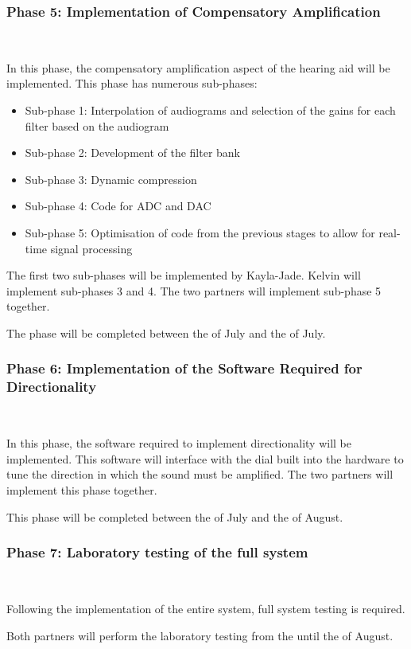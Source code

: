 \documentclass[10pt,twocolumn]{witseiepaper}
\begin{document}
\subsubsection*{Phase 5: Implementation of Compensatory Amplification} $    $

In this phase, the compensatory amplification aspect of the hearing aid will be implemented. This phase has numerous sub-phases:
\begin{itemize}
	\item Sub-phase 1: Interpolation of audiograms and selection of the gains for each filter based on the audiogram
	\item Sub-phase 2: Development of the filter bank
	\item Sub-phase 3: Dynamic compression
	\item Sub-phase 4: Code for ADC and DAC
	\item Sub-phase 5: Optimisation of code from the previous stages to allow for real-time signal processing
\end{itemize}

The first two sub-phases will be implemented by Kayla-Jade. Kelvin will implement sub-phases 3 and 4. The two partners will implement sub-phase 5 together.

The phase will be completed between the  of July and the  of July.


\subsubsection*{Phase 6: Implementation of the Software Required for Directionality} $    $

In this phase, the software required to implement directionality will be implemented. This software will interface with the dial built into the hardware to tune the direction in which the sound must be amplified. The two partners will implement this phase together. 

This phase will be completed between the  of July and the  of August.

\subsubsection*{Phase 7: Laboratory testing of the full system} $    $

Following the implementation of the entire system, full system testing is required. 

Both partners will perform the laboratory testing from the  until the  of August.
\end{document}
